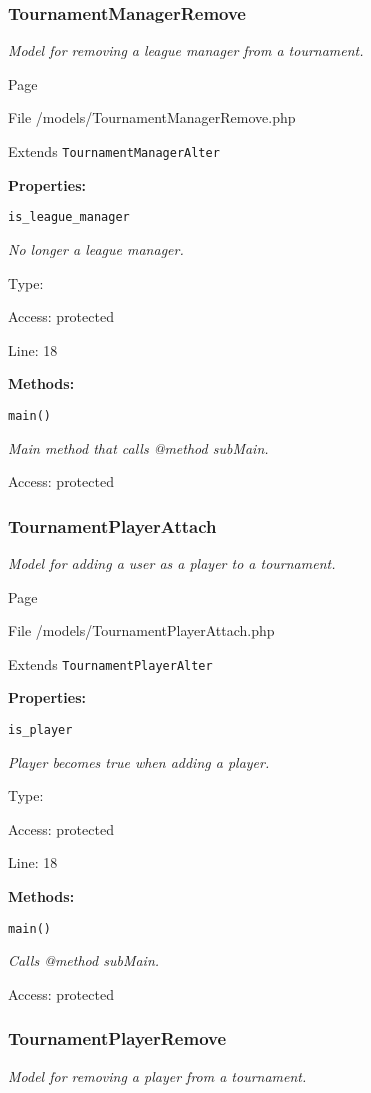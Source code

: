 \subsubsection{TournamentManagerRemove}
\textit{Model for removing a league manager from a tournament.}

Page \pageref{TournamentManagerRemove.php}

File /models/TournamentManagerRemove.php

Extends \texttt{TournamentManagerAlter}

\textbf{Properties:}

\texttt{is\_league\_manager}

{\scriptsize
\textit{No longer a league manager.}

Type: 

Access: protected

Line: 18

}
\textbf{Methods:}

\texttt{main()}

{\scriptsize
\textit{Main method that calls @method subMain.}

Access: protected

}

\subsubsection{TournamentPlayerAttach}
\textit{Model for adding a user as a player to a tournament.}

Page \pageref{TournamentPlayerAttach.php}

File /models/TournamentPlayerAttach.php

Extends \texttt{TournamentPlayerAlter}

\textbf{Properties:}

\texttt{is\_player}

{\scriptsize
\textit{Player becomes true when adding a player.}

Type: 

Access: protected

Line: 18

}
\textbf{Methods:}

\texttt{main()}

{\scriptsize
\textit{Calls @method subMain.}

Access: protected

}

\subsubsection{TournamentPlayerRemove}
\textit{Model for removing a player from a tournament.}

